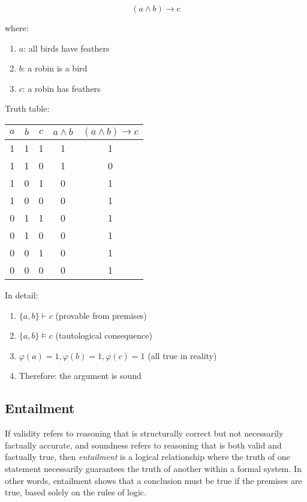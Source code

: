 \documentclass[12pt,a4paper,openany]{article}
\begin{document}
\[(a \land b) \to c\]

where:

\begin{enumerate}
\item \(a\): all birds have feathers
\item \(b\): a robin is a bird
\item \(c\): a robin has feathers
\end{enumerate}

Truth table:

\begin{center}
\begin{tabular}{|c|c|c|c|c|}
\hline
\(a\) & \(b\) & \(c\) & \(a \land b\) & \((a \land b) \to c\) \\
\hline
1 & 1 & 1 & 1 & 1 \\
1 & 1 & 0 & 1 & 0 \\
1 & 0 & 1 & 0 & 1 \\
1 & 0 & 0 & 0 & 1 \\
0 & 1 & 1 & 0 & 1 \\
0 & 1 & 0 & 0 & 1 \\
0 & 0 & 1 & 0 & 1 \\
0 & 0 & 0 & 0 & 1 \\
\hline
\end{tabular}
\end{center}

In detail: 

\begin{enumerate}
\item \(\{a, b\} \vdash c\) (provable from premises)
\item \(\{a, b\} \models c\) (tautological consequence)
\item \(\varphi(a) = 1, \varphi(b) = 1, \varphi(c) = 1\) (all true in reality)
\item Therefore: the argument is sound
\end{enumerate}

\subsection{Entailment}\label{entailment}

If validity refers to reasoning that is structurally correct but not
necessarily factually accurate, and soundness refers to reasoning that
is both valid and factually true, then \emph{entailment} is a logical
relationship where the truth of one statement necessarily guarantees the
truth of another within a formal system. In other words, entailment
shows that a conclusion must be true if the premises are true, based
solely on the rules of logic.
\end{document}
